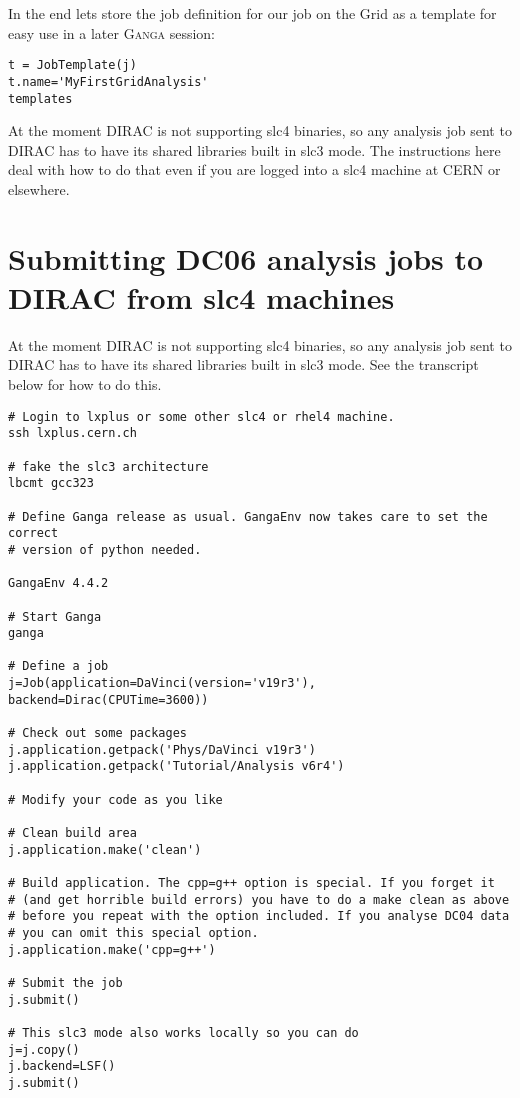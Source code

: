 \documentclass{howto}
\def\ganga {\textsc{Ganga}\xspace}
\begin{document}
In the end lets store the job definition for our job on the Grid as a template
for easy use in a later \ganga session:
\begin{verbatim}
t = JobTemplate(j)
t.name='MyFirstGridAnalysis'
templates
\end{verbatim}

At the moment DIRAC is not supporting slc4 binaries, so any analysis job sent to DIRAC has to have its shared libraries built in slc3 mode. The instructions here deal with how to do that even if you are logged into a slc4 machine at CERN or elsewhere.

\section{Submitting DC06 analysis jobs to DIRAC from slc4 machines}
At the moment DIRAC is not supporting slc4 binaries, so any analysis
job sent to DIRAC has to have its shared libraries built in slc3
mode. See the transcript below for how to do this.

\begin{verbatim}
# Login to lxplus or some other slc4 or rhel4 machine.
ssh lxplus.cern.ch

# fake the slc3 architecture
lbcmt gcc323

# Define Ganga release as usual. GangaEnv now takes care to set the correct
# version of python needed.

GangaEnv 4.4.2

# Start Ganga
ganga

# Define a job
j=Job(application=DaVinci(version='v19r3'), backend=Dirac(CPUTime=3600))

# Check out some packages
j.application.getpack('Phys/DaVinci v19r3')
j.application.getpack('Tutorial/Analysis v6r4')

# Modify your code as you like

# Clean build area
j.application.make('clean')

# Build application. The cpp=g++ option is special. If you forget it
# (and get horrible build errors) you have to do a make clean as above
# before you repeat with the option included. If you analyse DC04 data
# you can omit this special option.
j.application.make('cpp=g++') 

# Submit the job
j.submit()

# This slc3 mode also works locally so you can do
j=j.copy()
j.backend=LSF()
j.submit()
\end{verbatim}
\end{document}
